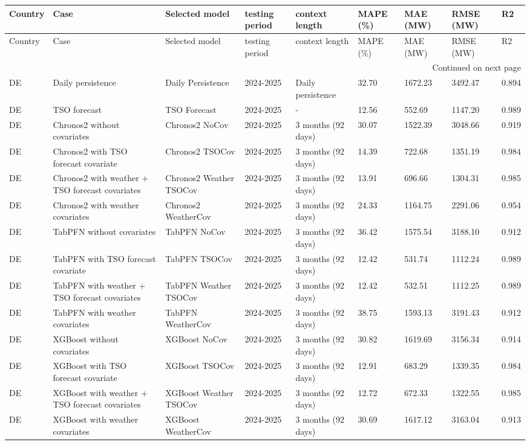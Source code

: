 \begin{longtable}{lllllllll}
\toprule
Country & Case & Selected model & testing period & context length & MAPE (\%) & MAE (MW) & RMSE (MW) & R2 \\
\midrule
\endfirsthead
\toprule
Country & Case & Selected model & testing period & context length & MAPE (\%) & MAE (MW) & RMSE (MW) & R2 \\
\midrule
\endhead
\midrule
\multicolumn{9}{r}{Continued on next page} \\
\midrule
\endfoot
\bottomrule
\endlastfoot
DE & Daily persistence & Daily Persistence & 2024-2025 & Daily persistence & 32.70 & 1672.23 & 3492.47 & 0.894 \\
DE & TSO forecast & TSO Forecast & 2024-2025 & - & 12.56 & 552.69 & 1147.20 & 0.989 \\
DE & Chronos2 without covariates & Chronos2 NoCov & 2024-2025 & 3 months (92 days) & 30.07 & 1522.39 & 3048.66 & 0.919 \\
DE & Chronos2 with TSO forecast covariate & Chronos2 TSOCov & 2024-2025 & 3 months (92 days) & 14.39 & 722.68 & 1351.19 & 0.984 \\
DE & Chronos2 with weather + TSO forecast covariates & Chronos2 Weather TSOCov & 2024-2025 & 3 months (92 days) & 13.91 & 696.66 & 1304.31 & 0.985 \\
DE & Chronos2 with weather covariates & Chronos2 WeatherCov & 2024-2025 & 3 months (92 days) & 24.33 & 1164.75 & 2291.06 & 0.954 \\
DE & TabPFN without covariates & TabPFN NoCov & 2024-2025 & 3 months (92 days) & 36.42 & 1575.54 & 3188.10 & 0.912 \\
DE & TabPFN with TSO forecast covariate & TabPFN TSOCov & 2024-2025 & 3 months (92 days) & 12.42 & 531.74 & 1112.24 & 0.989 \\
DE & TabPFN with weather + TSO forecast covariates & TabPFN Weather TSOCov & 2024-2025 & 3 months (92 days) & 12.42 & 532.51 & 1112.25 & 0.989 \\
DE & TabPFN with weather covariates & TabPFN WeatherCov & 2024-2025 & 3 months (92 days) & 38.75 & 1593.13 & 3191.43 & 0.912 \\
DE & XGBoost without covariates & XGBoost NoCov & 2024-2025 & 3 months (92 days) & 30.82 & 1619.69 & 3156.34 & 0.914 \\
DE & XGBoost with TSO forecast covariate & XGBoost TSOCov & 2024-2025 & 3 months (92 days) & 12.91 & 683.29 & 1339.35 & 0.984 \\
DE & XGBoost with weather + TSO forecast covariates & XGBoost Weather TSOCov & 2024-2025 & 3 months (92 days) & 12.72 & 672.33 & 1322.55 & 0.985 \\
DE & XGBoost with weather covariates & XGBoost WeatherCov & 2024-2025 & 3 months (92 days) & 30.69 & 1617.12 & 3163.04 & 0.913 \\
\end{longtable}
